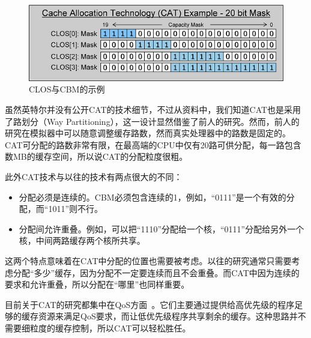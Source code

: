 \begin{figure}[htbp] 
    \centering
    \includegraphics[width=0.7\linewidth]{figures/CLOS.png}
    \caption{CLOS与CBM的示例}
    \label{fig:CLOS}
\end{figure}

虽然英特尔并没有公开CAT的技术细节，不过从资料中，我们知道CAT也是采用了路划分（Way Partitioning），这一设计显然借鉴了前人的研究。然而，前人的研究在模拟器中可以随意调整缓存路数，然而真实处理器中的路数是固定的。CAT可分配的路数非常有限，在最高端的CPU中仅有20路可供分配，每一路包含数MB的缓存空间，所以说CAT的分配粒度很粗。

此外CAT技术与以往的技术有两点很大的不同：
\begin{itemize}
\item 分配必须是连续的。CBM必须包含连续的1，例如，“0111”是一个有效的分配，而“1011”则不行。
\item 分配间允许重叠。例如，可以把“1110”分配给一个核，“0111”分配给另外一个核，中间两路缓存两个核所共享。
\end{itemize}

这两个特点意味着在CAT中分配的位置也需要被考虑。以往的研究通常只需要考虑分配“多少”缓存，因为分配不一定要连续而且不会重叠。而CAT中因为连续的要求和允许重叠，所以分配在“哪里”也同样重要。

目前关于CAT的研究都集中在QoS方面~\parencite{lo2015heracles, herdrich2016cache, funaro2016ginseng}。它们主要通过提供给高优先级的程序足够的缓存资源来满足QoS要求，而让低优先级程序共享剩余的缓存。这种思路并不需要细粒度的缓存控制，所以CAT可以轻松胜任。